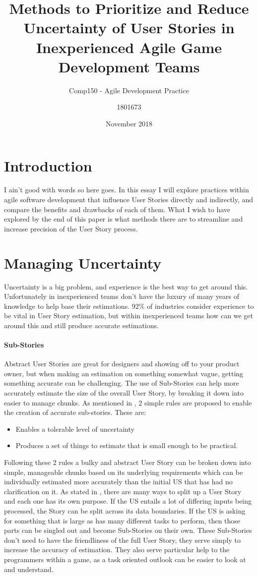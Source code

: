 \documentclass{scrartcl}
\title{Methods to Prioritize and Reduce Uncertainty of User Stories in Inexperienced Agile Game Development Teams}
\subtitle{Comp150 - Agile Development Practice}
\author{1801673}
\date{November 2018}
\begin{document}
    \maketitle
    \newpage
    \section{Introduction}
    I ain't good with words so here goes. In this essay I will explore practices within agile software development that influence User Stories directly and indirectly, and compare the benefits and drawbacks of each of them. What I wish to have explored by the end of this paper is what methods there are to streamline and increase precision of the User Story process.
    \section{Managing Uncertainty}
    Uncertainty is a big problem, and experience is the best way to get around this. Unfortunately in inexperienced teams don't have the luxury of many years of knowledge to help base their estimations. 92\% of industries \cite{8337935} consider experience to be vital in User Story estimation, but within inexperienced teams how can we get around this and still produce accurate estimations.
    \paragraph{Sub-Stories}
    Abstract User Stories are great for designers and showing off to your product owner, but when making an estimation on something somewhat vague, getting something accurate can be challenging. The use of Sub-Stories can help more accurately estimate the size of the overall User Story, by breaking it down into easier to manage chunks. As mentioned in  \cite{7100471}, 2 simple rules are proposed to enable the creation of accurate sub-stories. These are:
    \begin{itemize}
        \item Enables a tolerable level of uncertainty
        \item Produces a set of things to estimate that is small enough to be practical.
    \end{itemize}
    Following these 2 rules a bulky and abstract User Story can be broken down into simple, manageable chunks based on its underlying requirements which can be individually estimated more accurately than the initial US that has had no clarification on it.
    As stated in \cite{cohn2005agile}, there are many ways to split up a User Story and each one has its own purpose. If the US entails a lot of differing inputs being processed, the Story can be split across its data boundaries. If the US is asking for something that is large as has many different tasks to perform, then those parts can be singled out and become Sub-Stories on their own.
    These Sub-Stories don't need to have the friendliness of the full User Story, they serve simply to increase the accuracy of estimation. They also serve particular help to the programmers within a game, as a task oriented outlook can be easier to look at and understand.
\end{document}
